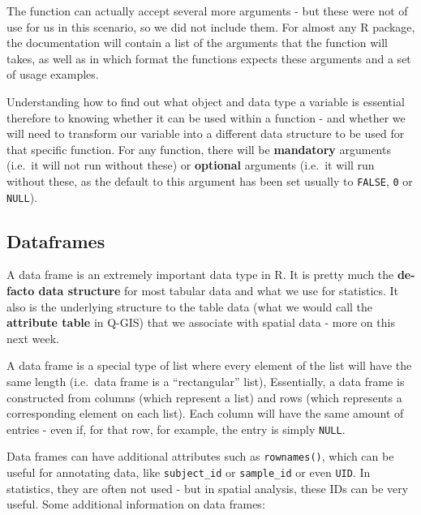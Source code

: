 \documentclass[
]{book}
\begin{document}
The function can actually accept several more arguments - but these were not of use for us in this scenario, so we did not include them. For almost any R package, the documentation will contain a list of the arguments that the function will takes, as well as in which format the functions expects these arguments and a set of usage examples.

Understanding how to find out what object and data type a variable is essential therefore to knowing whether it can be used within a function - and whether we will need to transform our variable into a different data structure to be used for that specific function. For any function, there will be \textbf{mandatory} arguments (i.e.~it will not run without these) or \textbf{optional} arguments (i.e.~it will run without these, as the default to this argument has been set usually to \texttt{FALSE}, \texttt{0} or \texttt{NULL}).

\hypertarget{dataframes}{%
\subsection{Dataframes}\label{dataframes}}

A data frame is an extremely important data type in R. It is pretty much the \textbf{de-facto data structure} for most tabular data and what we use for statistics. It also is the underlying structure to the table data (what we would call the \textbf{attribute table} in Q-GIS) that we associate with spatial data - more on this next week.

A data frame is a special type of list where every element of the list will have the same length (i.e.~data frame is a ``rectangular'' list), Essentially, a data frame is constructed from columns (which represent a list) and rows (which represents a corresponding element on each list). Each column will have the same amount of entries - even if, for that row, for example, the entry is simply \texttt{NULL}.

Data frames can have additional attributes such as \texttt{rownames()}, which can be useful for annotating data, like \texttt{subject\_id} or \texttt{sample\_id} or even \texttt{UID}. In statistics, they are often not used - but in spatial analysis, these IDs can be very useful. Some additional information on data frames:
\end{document}
